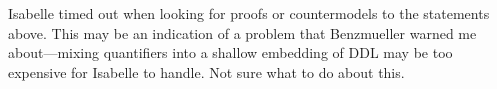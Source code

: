 \begin{isabellebody}
%
%
\endisatagproof
{\isafoldproof}%
%
\isadelimproof
%
\endisadelimproof
%
\begin{isamarkuptext}%
Isabelle timed out when looking for proofs or countermodels to the statements above. This may be 
        an indication of a problem that Benzmueller warned me about—mixing quantifiers into a shallow
        embedding of DDL may be too expensive for Isabelle to handle. Not sure what to do about this.%
\end{isamarkuptext}\isamarkuptrue%
%
\isadelimtheory
%
\endisadelimtheory
%
\isatagtheory
{}\isamarkupfalse%
%
\endisatagtheory
{\isafoldtheory}%
%
\isadelimtheory
%
\endisadelimtheory
%
\end{isabellebody}%
\endinput
